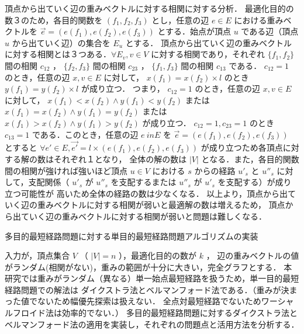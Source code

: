 \documentclass[12pt]{optlab-bachelor}
\begin{document}
頂点から出ていく辺の重みベクトルに対する相関に対する分析．
最適化目的の数３のため，各目的関数を $(f_1,f_2,f_3)$ とし，任意の辺 $e　\in E$ における重みベクトルを
 $\vec{e}=(e(f_1),e(f_2),e(f_3))$ とする．始点が頂点 $u$ である辺（頂点 $u$ から出ていく辺）の集合を $E_u$ とする．
頂点から出ていく辺の重みベクトルに対する相関とは３つある．$\forall E_v , v \in V$ に対する相関であり，それぞれ
 $\{f_1,f_2\}$ 間の相関 $c_{12}$ ， $\{f_2,f_3\}$ 間の相関 $c_{23}$ ， $\{f_1,f_3\}$ 間の相関 $c_{13}$ である．
$c_{12}=1$ のとき，任意の辺 $x,v\in E$ に対して， $x(f_1)=x(f_2)\times l$ のとき $y(f_1)=y(f_2)\times l$ が成り立つ．
つまり， $c_{12}=1$ のとき，任意の辺 $x,v\in E$ に対して， $x(f_1)<x(f_2) \land y(f_1)<y(f_2)$ または
 $x(f_1)=x(f_2) \land y(f_1)=y(f_2)$ または $x(f_1)>x(f_2) \land y(f_1)>y(f_2)$ が成り立つ．
$c_{12}=1,c_{23}=1$ のとき $c_{13}=1$ である．このとき，任意の辺 $e \ inE$ を $\vec{e}=(e(f_1),e(f_2),e(f_3))$ とすると
 $\forall e'\in E,\vec{e'} = l\times(e(f_1),e(f_2),e(f_3))$ が成り立つため各頂点に対する解の数はそれぞれ１となり，
全体の解の数は $|V|$ となる．また，各目的関数間の相関が強ければ強いほど頂点 $u\in V$ における $s$ からの経路 $u'_{s}$ と
 $u''_{s}$ に対して，支配関係（ $u'_{s}$ が $u''_{s}$ を支配するまたは $u''_{s}$ が $u'_{s}$ を支配する）が成り立つ可能性が
高いため全体の経路の数は少なくなる．
以上より，頂点から出ていく辺の重みベクトルに対する相関が弱いと最適解の数は増えるため，
頂点から出ていく辺の重みベクトルに対する相関が弱いと問題は難しくなる．


\begin{description}
  \item[多目的最短経路問題に対する単目的最短経路問題アルゴリズムの実装]
\end{description}

入力が，頂点集合 $V$ （ $|V|=n$ ），最適化目的の数が $k$ ，
辺の重みベクトルの値がランダム(相関がない)，重みの範囲が十分に大きい，完全グラフとする．
本研究では重みがランダム（異なる）単一始点最短経路を扱うため，単一目的最短経路問題での解法は
ダイクストラ法とベルマンフォード法である．（重みが決まった値でないため幅優先探索は扱えない．
全点対最短経路でないためワーシャルフロイド法は効率的でない．）
多目的最短経路問題に対するダイクストラ法とベルマンフォード法の適用を実装し，それぞれの問題点と活用方法を分析する．
\end{document}
